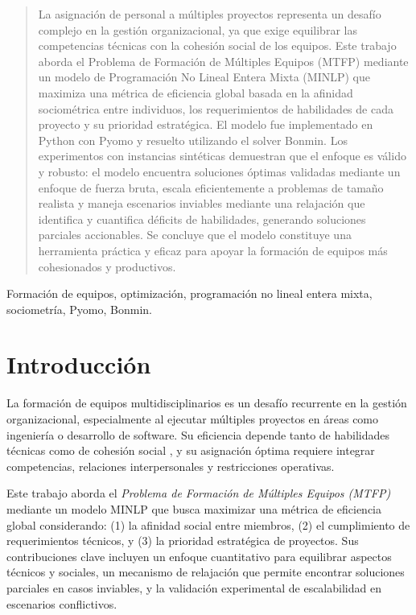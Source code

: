 \documentclass[conference]{IEEEtran}
\begin{document}
\begin{abstract}
    La asignación de personal a múltiples proyectos representa un desafío complejo en la gestión organizacional, ya que exige equilibrar las competencias técnicas con la cohesión social de los equipos. Este trabajo aborda el Problema de Formación de Múltiples Equipos (MTFP) mediante un modelo de Programación No Lineal Entera Mixta (MINLP) que maximiza una métrica de eficiencia global basada en la afinidad sociométrica entre individuos, los requerimientos de habilidades de cada proyecto y su prioridad estratégica. El modelo fue implementado en Python con Pyomo y resuelto utilizando el solver Bonmin. Los experimentos con instancias sintéticas demuestran que el enfoque es válido y robusto: el modelo encuentra soluciones óptimas validadas mediante un enfoque de fuerza bruta, escala eficientemente a problemas de tamaño realista y maneja escenarios inviables mediante una relajación que identifica y cuantifica déficits de habilidades, generando soluciones parciales accionables. Se concluye que el modelo constituye una herramienta práctica y eficaz para apoyar la formación de equipos más cohesionados y productivos.


\end{abstract}

\begin{IEEEkeywords}
    Formación de equipos, optimización, programación no lineal entera mixta, sociometría, Pyomo, Bonmin.
\end{IEEEkeywords}

\section{Introducción}
La formación de equipos multidisciplinarios es un desafío recurrente en la gestión organizacional, especialmente al ejecutar múltiples proyectos en áreas como ingeniería o desarrollo de software. Su eficiencia depende tanto de habilidades técnicas como de cohesión social \cite{gutierrez2016multiple}, y su asignación óptima requiere integrar competencias, relaciones interpersonales y restricciones operativas.

Este trabajo aborda el \textit{Problema de Formación de Múltiples Equipos (MTFP)} mediante un modelo MINLP que busca maximizar una métrica de eficiencia global considerando: (1) la afinidad social entre miembros, (2) el cumplimiento de requerimientos técnicos, y (3) la prioridad estratégica de proyectos. Sus contribuciones clave incluyen un enfoque cuantitativo para equilibrar aspectos técnicos y sociales, un mecanismo de relajación que permite encontrar soluciones parciales en casos inviables, y la validación experimental de escalabilidad en escenarios conflictivos.
\end{document}
